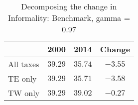 \documentclass[12pt]{article}
\begin{document}
 \begin{table}[h]
 \caption{Decomposing the change in Informality: Benchmark, gamma = 0.97}
 \begin{center}
 \label{results1}
 \begin{tabular}{lccc}
    & 2000 & 2014 & Change \\ \hline
  All taxes &  $39.29$ & $35.74$ & $-3.55$ \\ 
  TE only &  $39.29$ & $35.71$ & $-3.58$ \\ 
  TW only &  $39.29$ & $39.02$ & $-0.27$ \\ 
 \hline
 \end{tabular}
 \end{center}
 \end{table}
 
\end{document}
